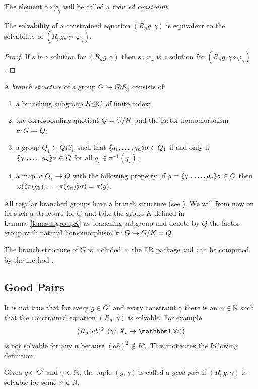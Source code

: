\documentclass[a4paper,11pt]{amsart}
\begin{document}
 The element $\gamma \circ \varphi_\gamma$ will be called a \emph{reduced constraint}.

\begin{lem} \label{lem:solvabilityWithReducedConstraint}
 The solvability of a constrained equation $(R_n g,\gamma)$ is equivalent to the 
 solvability of $(R_n g,\gamma\circ \varphi_\gamma)$.
\end{lem}
 \begin{proof}
 If $s$ is a solution for $(R_n g,\gamma)$ then $s\circ \varphi_\gamma$ is
 a solution for $(R_n g,\gamma\circ \varphi_\gamma)$. 
\end{proof}


\begin{defi} 
A \emph{branch structure} of a group $G\hookrightarrow G \wr S_n$ consists of  
\begin{enumerate}
 \item a branching subgroup $K{\mathrel\trianglelefteq} G$ of finite index;
 \item the corresponding quotient $Q={G/K}$ and the factor homomorphism $\pi\colon G \to Q$;
 \item a group $Q_1 \subset Q \wr S_n$ such that $\langle\negthickspace\langle q_1,\ldots,q_n\rangle\negthickspace\rangle\sigma\in Q_1$ if
  and only if $\langle\negthickspace\langle g_1,\ldots,g_n\rangle\negthickspace\rangle\sigma \in G$ for all $g_i \in \pi^{-1}(q_i)$;
 \item a map $\omega\colon Q_1 \to Q$ with the following property: if 
      $g=\langle\negthickspace\langle g_1,\ldots,g_n\rangle\negthickspace\rangle\sigma \in G$ then $\omega(\langle\negthickspace\langle\pi(g_1),\ldots,\pi(g_n)\rangle\negthickspace\rangle\sigma) = \pi(g)$.
\end{enumerate}
\end{defi}
All regular branched groups have a branch structure
(see {\cite[Remark after Definition~5.1]{Bartholdi:RepresentationZetaFunctions}}).
We will from now on fix such a structure for $G$ and take 
the group $K$ defined in Lemma~\ref{lem:subgroupK} as branching subgroup and 
denote by $Q$ the factor group with natural homomorphism $\pi\colon G \to {G/K}=Q$.

 The branch structure of $G$ is included in the FR package and can be computed by the method
  .

\subsection{Good Pairs}\label{sec:good_pairs}
It is not true that for every $g\in G'$ and every constraint $\gamma$
there is an $n\in\mathbb{N}$ such that the constrained equation
$(R_n,\gamma)$ is solvable. For example
\[\left(R_n(ab)^2,(\gamma\colon X_i\mapsto\id\;\forall i)\right)\] 
is not solvable for any $n$ because $(ab)^2\notin K'$.  This motivates
the following definition.
\begin{defi}
Given $g\in G'$ and $\gamma\in\mathfrak{R}$, the tuple $(g,\gamma)$ is called a \emph{good pair} if 
$(R_ng,\gamma)$ is solvable for some $n\in\mathbb{N}$.  
\end{defi}
\end{document}

